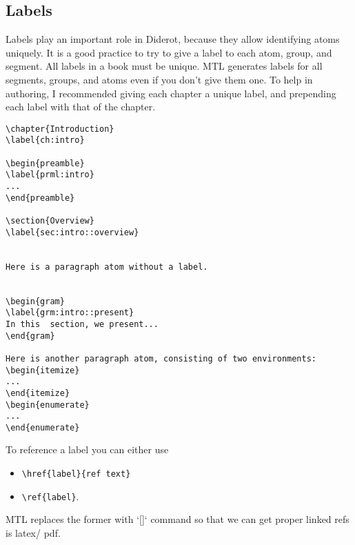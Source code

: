 \begin{example}
\begin{noten}
\begin{important}
\begin{definition}[Group]
\section{Labels}

Labels play an important role in Diderot, because they allow identifying atoms uniquely. It is a good practice to try to give a label to each atom, group, and segment.
All labels in a book must be unique.  MTL generates labels for all segments, groups, and atoms even if you don't give them one.  To help in authoring, I recommended  giving each chapter a unique label, and prepending each label with that of the chapter.


\begin{example}
\begin{lstlisting}
\chapter{Introduction}
\label{ch:intro}

\begin{preamble}
\label{prml:intro}
...
\end{preamble}

\section{Overview}
\label{sec:intro::overview}


Here is a paragraph atom without a label. 


\begin{gram}
\label{grm:intro::present}
In this  section, we present...
\end{gram}

Here is another paragraph atom, consisting of two environments:
\begin{itemize}
...
\end{itemize}
\begin{enumerate}
...
\end{enumerate}

\end{lstlisting}
\end{example}

\begin{gram}[References]
To reference a label you can either use
\begin{itemize}
\item \lstinline`\href{label}{ref text}`
\item \lstinline`\ref{label}`.
\end{itemize}
%
MTL replaces the former with `\hyperref[][]` command so that we can get proper linked refs is latex/ pdf.
\end{gram}



\end{definition}
\end{important}
\end{noten}
\end{example}
